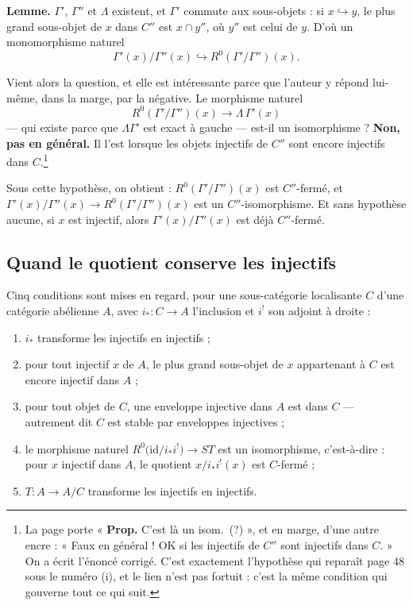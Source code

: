 \documentclass[11pt,a4paper]{article}
\begin{document}
\textbf{Lemme.} $\Gamma'$, $\Gamma''$ et $\Lambda$ existent, et $\Gamma'$
commute aux sous-objets : si $x \hookrightarrow y$, le plus grand sous-objet de
$x$ dans $C''$ est $x \cap y''$, où $y''$ est celui de $y$. D'où un
monomorphisme naturel
\[
  \Gamma'(x)/\Gamma''(x) \hookrightarrow
  R^{0}(\Gamma'/\Gamma'')(x) .
\]

Vient alors la question, et elle est intéressante parce que l'auteur y répond
lui-même, dans la marge, par la négative. Le morphisme naturel
\[
  R^{0}(\Gamma'/\Gamma'')(x) \longrightarrow \Lambda\,\Gamma'(x)
\]
— qui existe parce que $\Lambda\Gamma'$ est exact à gauche — est-il un
isomorphisme ? \textbf{Non, pas en général.} Il l'est lorsque les objets
injectifs de $C''$ sont encore injectifs dans $C$.\footnote{La page porte
« \textbf{Prop.} C'est là un isom.\ (?) », et en marge, d'une autre encre :
« Faux en général ! OK si les injectifs de $C''$ sont injectifs dans $C$. »
On a écrit l'énoncé corrigé. C'est exactement l'hypothèse qui reparaît page 48
sous le numéro (i), et le lien n'est pas fortuit : c'est la même condition qui
gouverne tout ce qui suit.}

Sous cette hypothèse, on obtient : $R^{0}(\Gamma'/\Gamma'')(x)$ est
$C''$-fermé, et $\Gamma'(x)/\Gamma''(x) \to R^{0}(\Gamma'/\Gamma'')(x)$ est un
$C''$-isomorphisme. Et sans hypothèse aucune, si $x$ est injectif, alors
$\Gamma'(x)/\Gamma''(x)$ est déjà $C''$-fermé.

\subsection*{Quand le quotient conserve les injectifs}

Cinq conditions sont mises en regard, pour une sous-catégorie localisante $C$
d'une catégorie abélienne $A$, avec $i_{*} : C \to A$ l'inclusion et
$i^{!}$ son adjoint à droite :

\begin{enumerate}
\item[(i)] $i_{*}$ transforme les injectifs en injectifs ;
\item[(ii)] pour tout injectif $x$ de $A$, le plus grand sous-objet de $x$
appartenant à $C$ est encore injectif dans $A$ ;
\item[(iii)] pour tout objet de $C$, une enveloppe injective dans $A$ est dans
$C$ — autrement dit $C$ est stable par enveloppes injectives ;
\item[(iv)] le morphisme naturel $R^{0}\bigl( \mathrm{id}/i_{*}i^{!} \bigr) \to
ST$ est un isomorphisme, c'est-à-dire : pour $x$ injectif dans $A$, le quotient
$x/i_{*}i^{!}(x)$ est $C$-fermé ;
\item[(v)] $T : A \to A/C$ transforme les injectifs en injectifs.
\end{enumerate}
\end{document}
